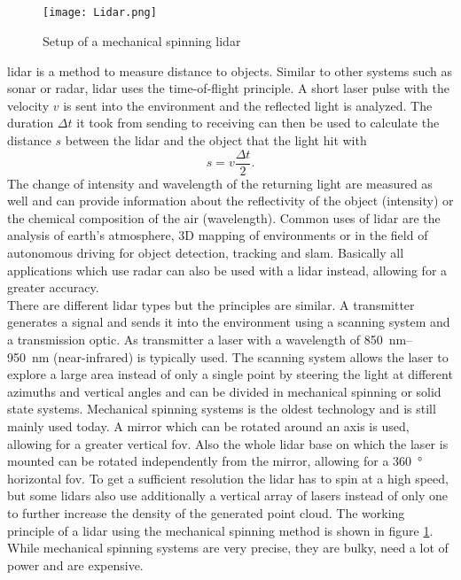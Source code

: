 \subsection{}
\begin{figure}[htb]
	\centering
	\texttt{[image: Lidar.png]}
	\caption{Setup of a mechanical spinning \acrshort{lidar} \cite{Li2020}}
	\label{fig:lidar}
\end{figure}
\gls{lidar} is a method to measure distance to objects.
Similar to other systems such as \gls{sonar} or \gls{radar}, \gls{lidar} uses the time-of-flight principle.
A short laser pulse with the velocity $v$ is sent into the environment and the reflected light is analyzed.
The duration $\Delta t$ it took from sending to receiving can then be used to calculate the distance $s$ between the \gls{lidar} and the object that the light hit with
\[ s = v\frac{\Delta t}{2}. \]
The change of intensity and wavelength of the returning light are measured as well and can provide information about the reflectivity of the object (intensity) or the chemical composition of the air (wavelength).
Common uses of \gls{lidar} are the analysis of earth's atmosphere, 3D mapping of environments or in the field of autonomous driving for object detection, tracking and \gls{slam}.
Basically all applications which use \gls{radar} can also be used with a \gls{lidar} instead, allowing for a greater accuracy.\\
There are different \gls{lidar} types but the principles are similar.
A transmitter generates a signal and sends it into the environment using a scanning system and a transmission optic.
As transmitter a laser with a wavelength of \SIrange{850}{950}{\nano\metre} (near-infrared) is typically used.
The scanning system allows the laser to explore a large area instead of only a single point by steering the light at different azimuths and vertical angles and can be divided in mechanical spinning or solid state systems.
Mechanical spinning systems is the oldest technology and is still mainly used today.
A mirror which can be rotated around an axis is used, allowing for a greater vertical \gls{fov}.
Also the whole \gls{lidar} base on which the laser is mounted can be rotated independently from the mirror, allowing for a \SI{360}{\degree} horizontal \gls{fov}.
To get a sufficient resolution the \gls{lidar} has to spin at a high speed, but some \gls{lidar}s also use additionally a vertical array of lasers instead of only one to further increase the density of the generated point cloud.
The working principle of a \gls{lidar} using the mechanical spinning method is shown in figure \ref{fig:lidar}.
While mechanical spinning systems are very precise, they are bulky, need a lot of power and are expensive.

